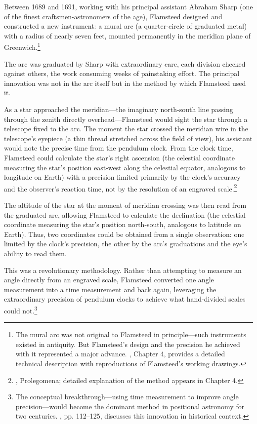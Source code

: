 Between 1689 and 1691, working with his principal assistant Abraham Sharp (one of the finest craftsmen-astronomers of the age), Flamsteed designed and constructed a new instrument: a mural arc (a quarter-circle of graduated metal) with a radius of nearly seven feet, mounted permanently in the meridian plane of Greenwich.\footnote{The mural arc was not original to Flamsteed in principle—such instruments existed in antiquity. But Flamsteed's design and the precision he achieved with it represented a major advance. \textcite{Howse1980}, Chapter 4, provides a detailed technical description with reproductions of Flamsteed's working drawings.}

The arc was graduated by Sharp with extraordinary care, each division checked against others, the work consuming weeks of painstaking effort. The principal innovation was not in the arc itself but in the method by which Flamsteed used it.

As a star approached the meridian—the imaginary north-south line passing through the zenith directly overhead—Flamsteed would sight the star through a telescope fixed to the arc. The moment the star crossed the meridian wire in the telescope's eyepiece (a thin thread stretched across the field of view), his assistant would note the precise time from the pendulum clock. From the clock time, Flamsteed could calculate the star's right ascension (the celestial coordinate measuring the star's position east-west along the celestial equator, analogous to longitude on Earth) with a precision limited primarily by the clock's accuracy and the observer's reaction time, not by the resolution of an engraved scale.\footnote{\textcite{Flamsteed1725}, Prolegomena; detailed explanation of the method appears in Chapter 4.}

The altitude of the star at the moment of meridian crossing was then read from the graduated arc, allowing Flamsteed to calculate the declination (the celestial coordinate measuring the star's position north-south, analogous to latitude on Earth). Thus, two coordinates could be obtained from a single observation: one limited by the clock's precision, the other by the arc's graduations and the eye's ability to read them.

This was a revolutionary methodology. Rather than attempting to measure an angle directly from an engraved scale, Flamsteed converted one angle measurement into a time measurement and back again, leveraging the extraordinary precision of pendulum clocks to achieve what hand-divided scales could not.\footnote{The conceptual breakthrough—using time measurement to improve angle precision—would become the dominant method in positional astronomy for two centuries. \textcite{Chapman1996}, pp. 112--125, discusses this innovation in historical context.}

